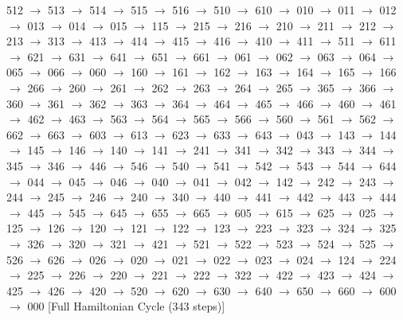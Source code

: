 512 $\rightarrow$ 513 $\rightarrow$ 514 $\rightarrow$ 515 $\rightarrow$ 516 $\rightarrow$ 510 $\rightarrow$ 610 $\rightarrow$ 010 $\rightarrow$ 011 $\rightarrow$ 012 $\rightarrow$ 013 $\rightarrow$ 014 $\rightarrow$ 015 $\rightarrow$ 115 $\rightarrow$ 215 $\rightarrow$ 216 $\rightarrow$ 210 $\rightarrow$ 211 $\rightarrow$ 212 $\rightarrow$ 213 $\rightarrow$ 313 $\rightarrow$ 413 $\rightarrow$ 414 $\rightarrow$ 415 $\rightarrow$ 416 $\rightarrow$ 410 $\rightarrow$ 411 $\rightarrow$ 511 $\rightarrow$ 611 $\rightarrow$ 621 $\rightarrow$ 631 $\rightarrow$ 641 $\rightarrow$ 651 $\rightarrow$ 661 $\rightarrow$ 061 $\rightarrow$ 062 $\rightarrow$ 063 $\rightarrow$ 064 $\rightarrow$ 065 $\rightarrow$ 066 $\rightarrow$ 060 $\rightarrow$ 160 $\rightarrow$ 161 $\rightarrow$ 162 $\rightarrow$ 163 $\rightarrow$ 164 $\rightarrow$ 165 $\rightarrow$ 166 $\rightarrow$ 266 $\rightarrow$ 260 $\rightarrow$ 261 $\rightarrow$ 262 $\rightarrow$ 263 $\rightarrow$ 264 $\rightarrow$ 265 $\rightarrow$ 365 $\rightarrow$ 366 $\rightarrow$ 360 $\rightarrow$ 361 $\rightarrow$ 362 $\rightarrow$ 363 $\rightarrow$ 364 $\rightarrow$ 464 $\rightarrow$ 465 $\rightarrow$ 466 $\rightarrow$ 460 $\rightarrow$ 461 $\rightarrow$ 462 $\rightarrow$ 463 $\rightarrow$ 563 $\rightarrow$ 564 $\rightarrow$ 565 $\rightarrow$ 566 $\rightarrow$ 560 $\rightarrow$ 561 $\rightarrow$ 562 $\rightarrow$ 662 $\rightarrow$ 663 $\rightarrow$ 603 $\rightarrow$ 613 $\rightarrow$ 623 $\rightarrow$ 633 $\rightarrow$ 643 $\rightarrow$ 043 $\rightarrow$ 143 $\rightarrow$ 144 $\rightarrow$ 145 $\rightarrow$ 146 $\rightarrow$ 140 $\rightarrow$ 141 $\rightarrow$ 241 $\rightarrow$ 341 $\rightarrow$ 342 $\rightarrow$ 343 $\rightarrow$ 344 $\rightarrow$ 345 $\rightarrow$ 346 $\rightarrow$ 446 $\rightarrow$ 546 $\rightarrow$ 540 $\rightarrow$ 541 $\rightarrow$ 542 $\rightarrow$ 543 $\rightarrow$ 544 $\rightarrow$ 644 $\rightarrow$ 044 $\rightarrow$ 045 $\rightarrow$ 046 $\rightarrow$ 040 $\rightarrow$ 041 $\rightarrow$ 042 $\rightarrow$ 142 $\rightarrow$ 242 $\rightarrow$ 243 $\rightarrow$ 244 $\rightarrow$ 245 $\rightarrow$ 246 $\rightarrow$ 240 $\rightarrow$ 340 $\rightarrow$ 440 $\rightarrow$ 441 $\rightarrow$ 442 $\rightarrow$ 443 $\rightarrow$ 444 $\rightarrow$ 445 $\rightarrow$ 545 $\rightarrow$ 645 $\rightarrow$ 655 $\rightarrow$ 665 $\rightarrow$ 605 $\rightarrow$ 615 $\rightarrow$ 625 $\rightarrow$ 025 $\rightarrow$ 125 $\rightarrow$ 126 $\rightarrow$ 120 $\rightarrow$ 121 $\rightarrow$ 122 $\rightarrow$ 123 $\rightarrow$ 223 $\rightarrow$ 323 $\rightarrow$ 324 $\rightarrow$ 325 $\rightarrow$ 326 $\rightarrow$ 320 $\rightarrow$ 321 $\rightarrow$ 421 $\rightarrow$ 521 $\rightarrow$ 522 $\rightarrow$ 523 $\rightarrow$ 524 $\rightarrow$ 525 $\rightarrow$ 526 $\rightarrow$ 626 $\rightarrow$ 026 $\rightarrow$ 020 $\rightarrow$ 021 $\rightarrow$ 022 $\rightarrow$ 023 $\rightarrow$ 024 $\rightarrow$ 124 $\rightarrow$ 224 $\rightarrow$ 225 $\rightarrow$ 226 $\rightarrow$ 220 $\rightarrow$ 221 $\rightarrow$ 222 $\rightarrow$ 322 $\rightarrow$ 422 $\rightarrow$ 423 $\rightarrow$ 424 $\rightarrow$ 425 $\rightarrow$ 426 $\rightarrow$ 420 $\rightarrow$ 520 $\rightarrow$ 620 $\rightarrow$ 630 $\rightarrow$ 640 $\rightarrow$ 650 $\rightarrow$ 660 $\rightarrow$ 600 $\rightarrow$ 000 
[Full Hamiltonian Cycle (343 steps)]


